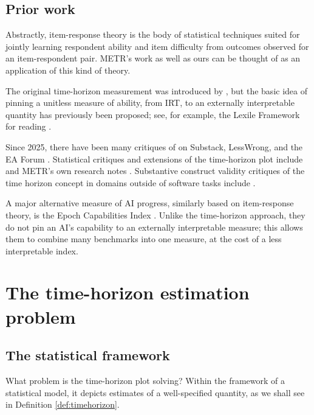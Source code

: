 \documentclass{article}
\theoremstyle{definition}
\begin{document}
\subsection{Prior work}\label{sec:prior-work}

Abstractly, item-response theory \citep{bakerBasicsItemResponse2001} is the body of statistical techniques suited for jointly learning respondent ability and item difficulty from outcomes observed for an item-respondent pair. METR's work as well as ours can be thought of as an application of this kind of theory. 

The original time-horizon measurement was introduced by \citet{kwaMeasuringAIAbility2025a}, but the basic idea of pinning a unitless measure of ability, from IRT, to an externally interpretable quantity has previously been proposed; see, for example, the Lexile Framework for reading \citep{stennerMeasuringReadingComprehension2023}. 

Since 2025, there have been many critiques of \citet{kwaMeasuringAIAbility2025a} on 
Substack, LessWrong, and the EA Forum \citep{shash42HowGameMETR2025, witkinMETRGraph2026,gregorylewisGeneralCapabilityCapabilities2026}.
Statistical critiques and extensions of the time-horizon plot include \citet{mossUpdatedMETRsData2026} and METR's own research notes \citep{ClarifyingLimitationsTime2026,ImpactModellingAssumptions2026}. Substantive construct validity critiques of the time horizon concept in domains outside of software tasks include \citet{HowDoesTime2025, mertensCrashingWavesVs2026a}. 

A major alternative measure of AI progress, similarly based on item-response theory, is the Epoch Capabilities Index \citep{hoRosettaStoneAI2025}. Unlike the time-horizon approach, they do not pin an AI's capability to an externally interpretable measure; this allows them to combine many benchmarks into one measure, at the cost of a less interpretable index. 


\section{The time-horizon estimation problem}\label{sec:th-estimation}

\subsection{The statistical framework}\label{sec:framework}

What problem is the time-horizon plot solving? Within the framework of a statistical model, it depicts estimates of a well-specified quantity, as we shall see in Definition \ref{def:timehorizon}. 
\end{document}
